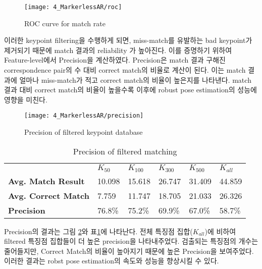 \begin{figure}[t!]
\centering
\texttt{[image: 4\_MarkerlessAR/roc]}
\caption{ROC curve for match rate}
\label{fig:markerless_roc}
\end{figure}

이러한 keypoint filtering을 수행하게 되면, miss-match를 유발하는 bad keypoint가 제거되기 때문에 match 결과의 reliability 가 높아진다. 이를 증명하기 위하여 Feature-level에서 Precision\cite{heinly_comparative_2012}을 계산하였다. Precision은 match 결과 구해진 correspondence pair의 수 대비 correct match의 비율로 계산이 된다. 이는 match 결과에 얼마나 miss-match가 적고 correct match의 비율이 높은지를 나타낸다. match 결과 대비 correct match의 비율이 높을수록 이후에 robust pose estimation의 성능에 영향을 미친다.

\begin{figure}[ht!]
\centering
\texttt{[image: 4\_MarkerlessAR/precision]}
\caption{Precision of filtered keypoint database}
\label{fig:markerless_precision}
\end{figure}

\begin{table}[b!]
\centering
\begin{tabular}{llllll}
\hline
\textbf{}                   & \textbf{$K_{50}$} & \textbf{$K_{100}$} & \textbf{$K_{300}$} & \textbf{$K_{500}$} & \textbf{$K_{all}$} \\
\textbf{Avg. Match Result}  & 10.098            & 15.618             & 26.747             & 31.409             & 44.859             \\
\textbf{Avg. Correct Match} & 7.759             & 11.747             & 18.705             & 21.033             & 26.326             \\
\textbf{Precision}          & 76.8\%            & 75.2\%             & 69.9\%             & 67.0\%             & 58.7\%             \\ \hline
\end{tabular}
  \caption{Precision of filtered matching}
  \label{tab:markerless_precision}
\end{table}

Precision의 결과는 그림 \ref{fig:markerless_precision}와 표\ref{tab:markerless_precision}에 나타난다. 전체 특징점 집합($K_{all}$)에 비하여 filtered 특징점 집합들이 더 높은 precision을 나타내주었다. 검출되는 특징점의 개수는 줄어들지만, Correct Match의 비율이 높아지기 때문에 높은 Precision을 보여주었다. 이러한 결과는 robst pose estimation의 속도와 성능을 향상시킬 수 있다.


